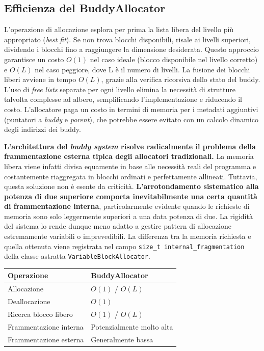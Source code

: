 \subsection*{Efficienza del BuddyAllocator}
L'operazione di allocazione esplora per prima la lista libera del livello più appropriato (\textit{best fit}). Se non trova blocchi disponibili, risale ai livelli superiori, dividendo i blocchi fino a raggiungere la dimensione desiderata. Questo approccio garantisce un costo $O(1)$ nel caso ideale (blocco disponibile nel livello corretto) e $O(L)$ nel caso peggiore, dove L è il numero di livelli. La fusione dei blocchi liberi avviene in tempo $O(L)$, grazie alla verifica ricorsiva dello stato del buddy. 
L'uso di \textit{free lists} separate per ogni livello elimina la necessità di strutture talvolta complesse ad albero, semplificando l'implementazione e riducendo il costo. L'allocatore paga un costo in termini di memoria per i metadati aggiuntivi (puntatori a \textit{buddy} e \textit{parent}), che potrebbe essere evitato con un calcolo dinamico degli indirizzi dei buddy. 

\textbf{L’architettura del \textit{buddy system} risolve radicalmente il problema della frammentazione esterna tipica degli allocatori tradizionali.} La memoria libera viene infatti divisa equamente in base alle necessità reali del programma e costantemente riaggregata in blocchi ordinati e perfettamente allineati. Tuttavia, questa soluzione non è esente da criticità. \textbf{L'arrotondamento sistematico alla potenza di due superiore comporta inevitabilmente una certa quantità di frammentazione interna}, particolarmente evidente quando le richieste di memoria sono solo leggermente superiori a una data potenza di due. La rigidità del sistema lo rende dunque meno adatto a gestire pattern di allocazione estremamente variabili o imprevedibili. La differenza tra la memoria richiesta e quella ottenuta viene registrata nel campo \texttt{size\_t internal\_fragmentation} della classe astratta \texttt{VariableBlockAllocator}.

\begin{center}
\begin{tabular}{|l|l|}
\hline
Operazione & BuddyAllocator \\
\hline
Allocazione & $O(1)$ / $O(L)$ \\
Deallocazione & $O(1)$ \\
Ricerca blocco libero & $O(1)$ / $O(L)$ \\
Frammentazione interna & Potenzialmente molto alta \\
Frammentazione esterna & Generalmente bassa \\
\hline
\end{tabular}
\end{center}

